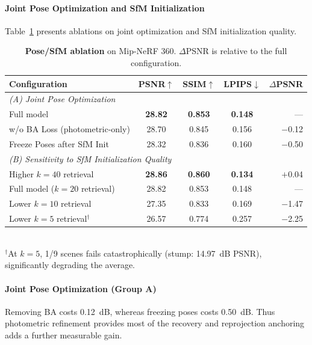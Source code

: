 \documentclass[sigconf]{acmart}
\begin{document}
\paragraph{Joint Pose Optimization and SfM Initialization}
Table~\ref{tab:ablation_sfm} presents ablations on joint optimization and SfM initialization quality.

\begin{table}[t]
    \centering
    \scriptsize
    \setlength\tabcolsep{1.5pt}
    \caption{
        \textbf{Pose/SfM ablation} on Mip-NeRF 360. $\Delta$PSNR is relative to the full configuration.
    }
    \begin{tabular}{l ccc r}
        \toprule
        Configuration & PSNR$\uparrow$ & SSIM$\uparrow$ & LPIPS$\downarrow$ & $\Delta$PSNR \\
        \midrule
        \multicolumn{5}{l}{\textit{(A) Joint Pose Optimization}} \\
        \quad Full model & \textbf{28.82} & \textbf{0.853} & \textbf{0.148} & --- \\
        \quad w/o BA Loss (photometric-only) & 28.70 & 0.845 & 0.156 & $-$0.12 \\
        \quad Freeze Poses after SfM Init & 28.32 & 0.836 & 0.160 & $-$0.50 \\
        \midrule
        \multicolumn{5}{l}{\textit{(B) Sensitivity to SfM Initialization Quality}} \\
        \quad Higher $k{=}40$ retrieval & \textbf{28.86} & \textbf{0.860} & \textbf{0.134} & $+$0.04 \\
        \quad Full model ($k{=}20$ retrieval) & 28.82 & 0.853 & 0.148 & --- \\
        \quad Lower $k{=}10$ retrieval & 27.35 & 0.833 & 0.169 & $-$1.47 \\
        \quad Lower $k{=}5$ retrieval$^\dagger$ & 26.57 & 0.774 & 0.257 & $-$2.25 \\
        \bottomrule
    \end{tabular}
    \\[2pt]
    {\scriptsize $^\dagger$At $k{=}5$, 1/9 scenes fails catastrophically (stump: 14.97~dB PSNR), significantly degrading the average.}
    \label{tab:ablation_sfm}
\end{table}

\paragraph{Joint Pose Optimization (Group A)}
Removing BA costs 0.12~dB, whereas freezing poses costs 0.50~dB. Thus photometric refinement provides most of the recovery and reprojection anchoring adds a further measurable gain.
\end{document}
